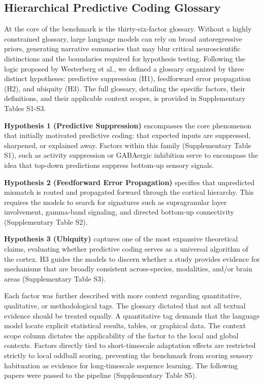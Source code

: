 \documentclass[12pt]{article}
\begin{document}
\subsection{Hierarchical Predictive Coding Glossary}\label{hierarchical-predictive-coding-glossary}

At the core of the benchmark is the thirty-six-factor glossary. Without a highly constrained glossary, large language models can rely on broad autoregressive priors, generating narrative summaries that may blur critical neuroscientific distinctions and the boundaries required for hypothesis testing\cite{ref58}. Following the logic proposed by Westerberg et al.\cite{ref34}, we defined a glossary organized by three distinct hypotheses: predictive suppression (H1), feedforward error propagation (H2), and ubiquity (H3). The full glossary, detailing the specific factors, their definitions, and their applicable context scopes, is provided in Supplementary Tables S1-S3.

\textbf{Hypothesis 1 (Predictive Suppression)} encompasses the core phenomenon that initially motivated predictive coding: that expected inputs are suppressed, sharpened, or explained away. Factors within this family (Supplementary Table S1), such as activity suppression or GABAergic inhibition serve to encompass the idea that top-down predictions suppress bottom-up sensory signals\cite{ref6,ref14}.




\textbf{Hypothesis 2 (Feedforward Error Propagation)} specifies that unpredicted mismatch is routed and propagated forward through the cortical hierarchy. This requires the models to search for signatures such as supragranular layer involvement\cite{ref59}, gamma-band signaling\cite{ref14}, and directed bottom-up connectivity\cite{ref24} (Supplementary Table S2).




\textbf{Hypothesis 3 (Ubiquity)} captures one of the most expansive theoretical claims, evaluating whether predictive coding serves as a universal algorithm of the cortex\cite{ref10,ref14}. H3 guides the models to discern whether a study provides evidence for mechanisms that are broadly consistent across-species, modalities, and/or brain areas (Supplementary Table S3).






Each factor was further described with more context regarding quantitative, qualitative, or methodological tags. The glossary dictated that not all textual evidence should be treated equally. A quantitative tag demands that the language model locate explicit statistical results, tables, or graphical data. The context scope column dictates the applicability of the factor to the local and global contexts. Factors directly tied to short-timescale adaptation effects are restricted strictly to local oddball scoring, preventing the benchmark from scoring sensory habituation as evidence for long-timescale sequence learning. The following papers were passed to the pipeline (Supplementary Table S5).
\end{document}
